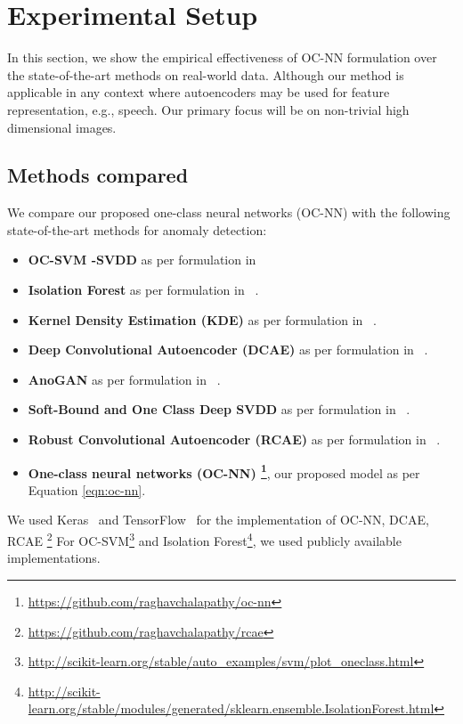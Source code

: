\section{Experimental Setup}
\label{sec:ocnnexperiment-setup}

In this section, we show the empirical effectiveness of OC-NN formulation over the state-of-the-art methods on real-world data. Although our method is applicable in any context where autoencoders may be used for feature representation, e.g., speech.  Our primary focus will be on non-trivial high dimensional images.
\subsection{Methods compared}
\label{sec:methods_compared}
We compare our proposed one-class neural networks (OC-NN) with the following state-of-the-art methods for anomaly detection:
\let\labelitemi\labelitemii
\begin{itemize}{}
    \item \textbf{OC-SVM -SVDD} as per formulation in ~\cite{scholkopf2002support}
    \item \textbf{Isolation Forest} as per formulation in ~\cite{liu2008isolation}.
    \item \textbf{Kernel Density Estimation (KDE)} as per formulation in ~\cite{parzen1962estimation}.
    \item \textbf{Deep Convolutional Autoencoder (DCAE)} as per formulation in ~\cite{masci2011stacked}.
    \item \textbf{AnoGAN} as per formulation in ~\cite{radford2015unsupervised}.
    \item \textbf{Soft-Bound and One Class Deep SVDD} as per formulation in ~\cite{pmlrv80ruff18a}.
    \item \textbf{Robust Convolutional Autoencoder (RCAE)} as per formulation in ~\cite{chalapathy2017robust}.
    \item \textbf{One-class neural networks (OC-NN) \footnote{\url{https://github.com/raghavchalapathy/oc-nn}}}, our proposed model as per Equation \ref{eqn:oc-nn}.
\end{itemize}
We used Keras~\cite{chollet2015keras} and  TensorFlow~\cite{abadi2016tensorflow} for the implementation of OC-NN, DCAE, RCAE \footnote{\url{https://github.com/raghavchalapathy/rcae}}
For OC-SVM\footnote{\url{http://scikit-learn.org/stable/auto_examples/svm/plot_oneclass.html}} and Isolation Forest\footnote{\url{http://scikit-learn.org/stable/modules/generated/sklearn.ensemble.IsolationForest.html}}, we used publicly available implementations.

